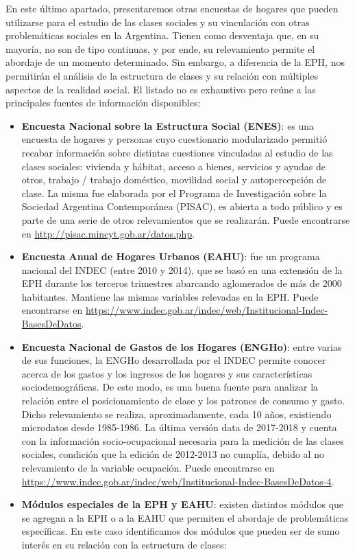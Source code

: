 \documentclass[
]{article}
\begin{document}
En este último apartado, presentaremos otras encuestas de hogares que pueden utilizarse para el estudio de las clases sociales y su vinculación con otras problemáticas sociales en la Argentina. Tienen como desventaja que, en su mayoría, no son de tipo continuas, y por ende, su relevamiento permite el abordaje de un momento determinado. Sin embargo, a diferencia de la EPH, nos permitirán el análisis de la estructura de clases y su relación con múltiples aspectos de la realidad social. El listado no es exhaustivo pero reúne a las principales fuentes de información disponibles:

\begin{itemize}
\item
  \textbf{Encuesta Nacional sobre la Estructura Social (ENES)}: es una encuesta de hogares y personas cuyo cuestionario modularizado permitió recabar información sobre distintas cuestiones vinculadas al estudio de las clases sociales: vivienda y hábitat, acceso a bienes, servicios y ayudas de otros, trabajo / trabajo doméstico, movilidad social y autopercepción de clase. La misma fue elaborada por el Programa de Investigación sobre la Sociedad Argentina Contemporánea (PISAC), es abierta a todo público y es parte de una serie de otros relevamientos que se realizarán. Puede encontrarse en \url{http://pisac.mincyt.gob.ar/datos.php}.
\item
  \textbf{Encuesta Anual de Hogares Urbanos (EAHU)}: fue un programa nacional del INDEC (entre 2010 y 2014), que se basó en una extensión de la EPH durante los terceros trimestres abarcando aglomerados de más de 2000 habitantes. Mantiene las mismas variables relevadas en la EPH. Puede encontrarse en \url{https://www.indec.gob.ar/indec/web/Institucional-Indec-BasesDeDatos}.
\item
  \textbf{Encuesta Nacional de Gastos de los Hogares (ENGHo)}: entre varias de sus funciones, la ENGHo desarrollada por el INDEC permite conocer acerca de los gastos y los ingresos de los hogares y sus características sociodemográficas. De este modo, es una buena fuente para analizar la relación entre el posicionamiento de clase y los patrones de consumo y gasto. Dicho relevamiento se realiza, aproximadamente, cada 10 años, existiendo microdatos desde 1985-1986. La última versión data de 2017-2018 y cuenta con la información socio-ocupacional necesaria para la medición de las clases sociales, condición que la edición de 2012-2013 no cumplía, debido al no relevamiento de la variable ocupación. Puede encontrarse en \url{https://www.indec.gob.ar/indec/web/Institucional-Indec-BasesDeDatos-4}.
\item
  \textbf{Módulos especiales de la EPH y EAHU}: existen distintos módulos que se agregan a la EPH o a la EAHU que permiten el abordaje de problemáticas específicas. En este caso identificamos dos módulos que pueden ser de sumo interés en su relación con la estructura de clases:


\end{itemize}
\end{document}

